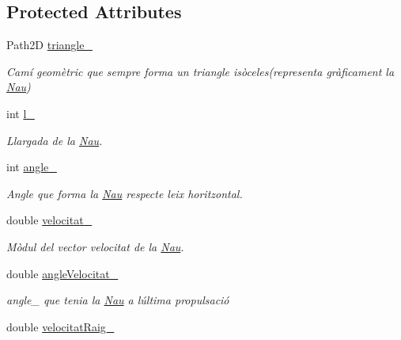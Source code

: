 \subsection*{Protected Attributes}
\begin{DoxyCompactItemize}
\item 
Path2\+D \hyperlink{class_nau_ad397487e3dc0062cc71fdfc4c562e347}{triangle\+\_\+}
\begin{DoxyCompactList}\small\item\em Camí geomètric que sempre forma un triangle isòceles(representa gràficament la \hyperlink{class_nau}{Nau}) \end{DoxyCompactList}\item 
int \hyperlink{class_nau_a67c5417119c7e520e1876a919119867d}{l\+\_\+}
\begin{DoxyCompactList}\small\item\em Llargada de la \hyperlink{class_nau}{Nau}. \end{DoxyCompactList}\item 
int \hyperlink{class_nau_a7bdee12f00bd2087872ff3018144799e}{angle\+\_\+}
\begin{DoxyCompactList}\small\item\em Angle que forma la \hyperlink{class_nau}{Nau} respecte l\textquotesingle{}eix horitzontal. \end{DoxyCompactList}\item 
double \hyperlink{class_nau_ac1151817b8deaed7c77ceba3141b86e5}{velocitat\+\_\+}
\begin{DoxyCompactList}\small\item\em Mòdul del vector velocitat de la \hyperlink{class_nau}{Nau}. \end{DoxyCompactList}\item 
double \hyperlink{class_nau_aa2ee3693a5f2a95449e0310f34d9fad4}{angle\+Velocitat\+\_\+}
\begin{DoxyCompactList}\small\item\em angle\+\_\+ que tenia la \hyperlink{class_nau}{Nau} a l\textquotesingle{}última propulsació \end{DoxyCompactList}\item 
double \hyperlink{class_nau_a1400505da3bafa2056c8e542a7811b33}{velocitat\+Raig\+\_\+}
\end{DoxyCompactItemize}
